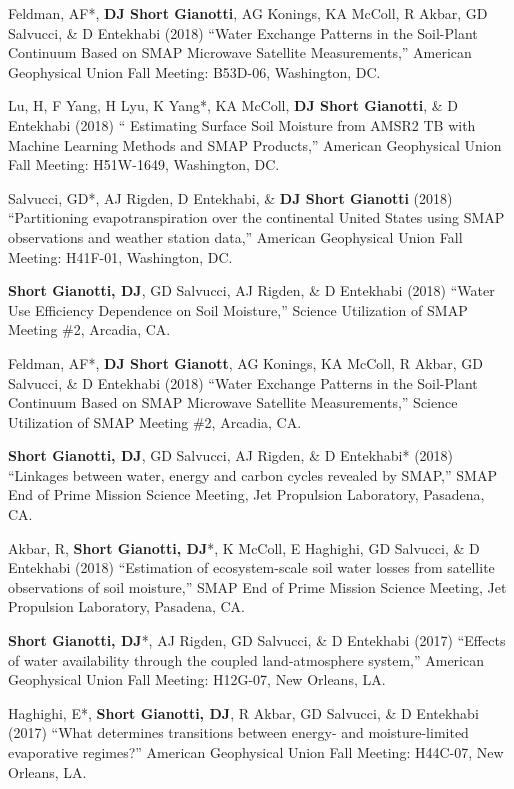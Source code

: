 \documentclass[10pt, a4paper]{article}
\newcommand{\lbr}{\vspace*{12pt}}
\newcommand{\years}[1]{\mbox{}\marginnote{\scriptsize #1}} %
\begin{document}
\years{2018}Feldman, AF*, \textbf{DJ Short Gianotti}, AG Konings, KA McColl, R Akbar, GD Salvucci, \& D Entekhabi (2018) ``Water Exchange Patterns in the Soil-Plant Continuum Based on SMAP Microwave Satellite Measurements,'' American Geophysical Union Fall Meeting: B53D-06, Washington, DC.\lbr

\years{2018}Lu, H, F Yang, H Lyu, K Yang*, KA McColl, \textbf{DJ Short Gianotti}, \& D Entekhabi (2018) `` Estimating Surface Soil Moisture from AMSR2 TB with Machine Learning Methods and SMAP Products,'' American Geophysical Union Fall Meeting: H51W-1649, Washington, DC.\lbr

\years{2018}Salvucci, GD*, AJ Rigden, D Entekhabi, \& \textbf{DJ Short Gianotti} (2018) ``Partitioning evapotranspiration over the continental United States using SMAP observations and weather station data,'' American Geophysical Union Fall Meeting: H41F-01, Washington, DC.\lbr

\years{2018}\textbf{Short Gianotti, DJ}, GD Salvucci, AJ Rigden, \& D Entekhabi (2018) ``Water Use Efficiency Dependence on Soil Moisture,'' Science Utilization of SMAP Meeting \#2, Arcadia, CA.\lbr %

\years{2018}Feldman, AF*, \textbf{DJ Short Gianott}, AG Konings, KA McColl, R Akbar, GD Salvucci, \& D Entekhabi (2018) ``Water Exchange Patterns in the Soil-Plant Continuum Based on SMAP Microwave Satellite Measurements,'' Science Utilization of SMAP Meeting \#2, Arcadia, CA.\lbr %

\years{2018}\textbf{Short Gianotti, DJ}, GD Salvucci, AJ Rigden, \& D Entekhabi* (2018) ``Linkages between water, energy and carbon cycles revealed by SMAP,'' SMAP End of Prime Mission Science Meeting, Jet Propulsion Laboratory, Pasadena, CA. \lbr %

\years{2018}Akbar, R, \textbf{Short Gianotti, DJ}*, K McColl, E Haghighi, GD Salvucci, \& D Entekhabi (2018) ``Estimation of ecosystem-scale soil water losses from satellite observations of soil moisture,'' SMAP End of Prime Mission Science Meeting, Jet Propulsion Laboratory, Pasadena, CA. \lbr %

\years{2017}\textbf{Short Gianotti, DJ}*, AJ Rigden, GD Salvucci, \& D Entekhabi (2017) ``Effects of water availability through the coupled land-atmosphere system,'' American Geophysical Union Fall Meeting: H12G-07, New Orleans, LA.\lbr

\years{2017}Haghighi, E*, \textbf{Short Gianotti, DJ}, R Akbar, GD Salvucci, \& D Entekhabi (2017) ``What determines transitions between energy- and moisture-limited evaporative regimes?'' American Geophysical Union Fall Meeting: H44C-07, New Orleans, LA.\lbr
\end{document}
